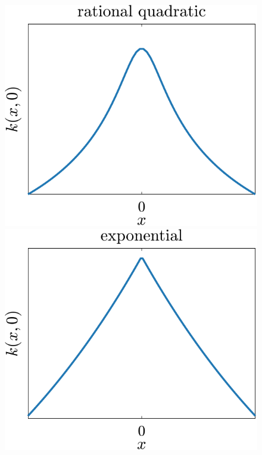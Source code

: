 \begin{figure}[t]
	\includegraphics[scale=0.4]{../images/chap2_kernel_rq.pdf} \\[3pt]
	\includegraphics[scale=0.4]{../images/chap2_kernel_ex.pdf} \hspace{3pt}

\end{figure}
